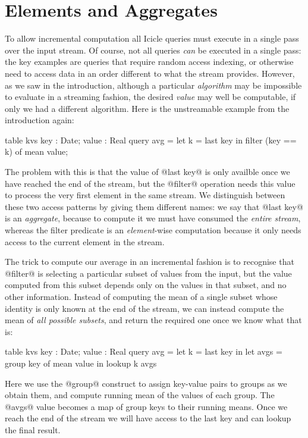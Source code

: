 
\eject
\section{Elements and Aggregates}
To allow incremental computation all Icicle queries must execute in a single pass over the input stream.
Of course, not all queries \emph{can} be executed in a single pass: the key examples are queries that require random access indexing, or otherwise need to access data in an order different to what the stream provides.
However, as we saw in the introduction, although a particular \emph{algorithm} may be impossible to evaluate in a streaming fashion, the desired \emph{value} may well be computable, if only we had a different algorithm.
Here is the unstreamable example from the introduction again:
\begin{code}
  table kvs { key : Date; value : Real }
  query avg = let k = last key
              in  filter (key == k) of mean value;
\end{code}

The problem with this is that the value of @last key@ is only availble once we have reached the end of the stream, but the @filter@ operation needs this value to process the very first element in the same stream.
We distinguish between these two access patterns by giving them different names: we say that @last key@ is an \emph{aggregate}, because to compute it we must have consumed the \emph{entire stream}, whereas the filter predicate is an \emph{element}-wise computation because it only needs access to the current element in the stream.

The trick to compute our average in an incremental fashion is to recognise that @filter@ is selecting a particular subset of values from the input, but the value computed from this subset depends only on the values in that subset, and no other information. Instead of computing the mean of a single subset whose identity is only known at the end of the stream, we can instead compute the mean of \emph{all possible subsets}, and return the required one once we know what that is:
\begin{code}
  table kvs { key : Date; value : Real } 
  query avg = let k    = last  key in
              let avgs = group key of mean value
              in  lookup k avgs
\end{code}

Here we use the @group@ construct to assign key-value pairs to groups as we obtain them, and compute running mean of the values of each group. The @avgs@ value becomes a map of group keys to their running means. Once we reach the end of the stream we will have access to the last key and can lookup the final result.


